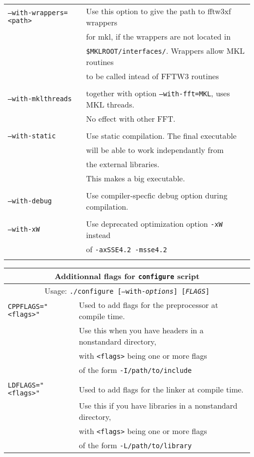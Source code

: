 \documentclass[12pt]{article}
\begin{document}
\begin{center}
\begin{tabular}{ll}
{\tt --with-wrappers=<path>} & Use this option to give the path to fftw3xf wrappers\\
                             & for mkl, if the wrappers are not located in \\
                             & {\tt \$MKLROOT/interfaces/}. Wrappers allow MKL routines\\
                             & to be called intead of FFTW3 routines\\
\\
{\tt --with-mklthreads} & together with option {\tt --with-fft=MKL}, uses MKL threads. \\
                        & No effect with other FFT.\\
\\
{\tt --with-static} & Use static compilation. The final executable \\
& will be able to work independantly from \\
& the external libraries.\\
& This makes a big executable.\\
\\
{\tt --with-debug} & Use compiler-specfic debug option during compilation. \\
\\
{\tt --with-xW} & Use deprecated optimization option {\tt -xW} instead \\
          & of {\tt-axSSE4.2 -msse4.2}  \\
\\
\hline

\end{tabular}
\end{center}

\newpage

\begin{center}
\begin{tabular}{ll}
\hline
\multicolumn{2}{c}{Additionnal flags for {\tt configure} script}\\
\hline
\multicolumn{2}{c}{Usage: {\tt ./configure [--with-{\it options}] [{\it FLAGS}]} } \\
\hline
{\tt CPPFLAGS="<flags>"} & Used to add flags for the preprocessor at compile time.\\
& Use this when you have headers in a nonstandard directory, \\
& with {\tt <flags>} being one or more flags \\
& of the form {\tt -I/path/to/include} \\
\\
{\tt LDFLAGS="<flags>"} &  Used to add flags for the linker at compile time.\\
& Use this if you have libraries in a nonstandard directory,\\
& with {\tt <flags>} being one or more flags \\
& of the form {\tt -L/path/to/library } \\
\hline
\end{tabular}

\end{center}
\end{document}
